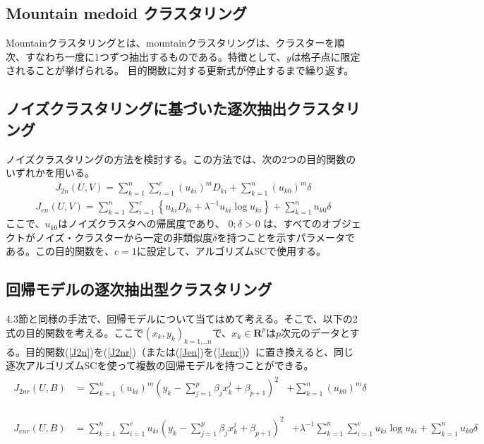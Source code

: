 \documentclass[10pt,onecolumn]{jsarticle}
\begin{document}
\subsection{Mountain medoid クラスタリング}
Mountainクラスタリングとは、mountainクラスタリングは、クラスターを順次、すなわち一度に1つずつ抽出するものである。特徴として、$y$は格子点に限定されることが挙げられる。
目的関数に対する更新式が停止するまで繰り返す。

\subsection{ノイズクラスタリングに基づいた逐次抽出クラスタリング}
ノイズクラスタリングの方法を検討する。この方法では、次の2つの目的関数のいずれかを用いる。
\begin{align}
	\label{J2n}
	J_{2 n}(U, V)=\sum_{k=1}^{n} \sum_{i=1}^{c}\left(u_{k i}\right)^{m} D_{k i}+\sum_{k=1}^{n}\left(u_{k 0}\right)^{m} \delta
\end{align}
\begin{align}
	\label{Jen}
	J_{e n}(U, V)=\sum_{k=1}^{n} \sum_{i=1}^{c}\left\{u_{k i} D_{k i}+\lambda^{-1} u_{k i} \log u_{k i}\right\}+\sum_{k=1}^{n} u_{k 0} \delta
\end{align}
ここで、$u_{k0}$はノイズクラスタへの帰属度であり、 $0; \delta > 0$ は、すべてのオブジェクトがノイズ・クラスターから一定の非類似度$\delta$を持つことを示すパラメータである。この目的関数を、$c=1$に設定して、アルゴリズムSCで使用する。

\subsection{回帰モデルの逐次抽出型クラスタリング}
4.3節と同様の手法で、回帰モデルについて当てはめて考える。そこで、以下の2式の目的関数を考える。ここで${(x_k,y_k)}_{k=1,..n}$で、$x_{k} \in \boldsymbol{R}^{p}$は$p$次元のデータとする。目的関数(\ref{J2n})を(\ref{J2nr})（または(\ref{Jen})を(\ref{Jenr})）に置き換えると、同じ逐次アルゴリズムSCを使って複数の回帰モデルを持つことができる。
\begin{align}
	\label{J2nr}
	\begin{aligned}
J_{2 n r}(U, B) &=\sum_{k=1}^{n}\left(u_{k i}\right)^{m}\left(y_{k}-\sum_{j=1}^{p} \beta_{j} x_{k}^{j}+\beta_{p+1}\right)^{2}
&+\sum_{k=1}^{n}\left(u_{k 0}\right)^{m} \delta
\end{aligned}
\end{align}

\begin{align}
	\label{Jenr}
	\begin{aligned}
	J_{e n r}(U, B) &=\sum_{k=1}^{n} \sum_{i=1}^{c} u_{k i}\left(y_{k}-\sum_{j=1}^{p} \beta_{j} x_{k}^{j}+\beta_{p+1}\right)^{2}
	&+\lambda^{-1} \sum_{k=1}^{n} \sum_{i=1}^{c} u_{k i} \log u_{k i}+\sum_{k=1}^{n} u_{k 0} \delta
	\end{aligned}
\end{align}
\end{document}

